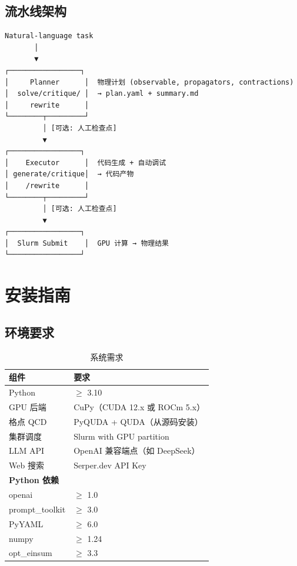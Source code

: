 \documentclass[12pt,a4paper]{ctexart}
\begin{document}
\subsection{流水线架构}

\begin{center}
\begin{tcolorbox}[width=0.9\textwidth,boxrule=0.5pt,colback=gray!5,colframe=gray!50]
\begin{verbatim}
Natural-language task
       │
       ▼
┌─────────────────┐
│     Planner      │  物理计划 (observable, propagators, contractions)
│  solve/critique/ │  → plan.yaml + summary.md
│     rewrite      │
└────────┬─────────┘
         │ [可选: 人工检查点]
         ▼
┌─────────────────┐
│    Executor      │  代码生成 + 自动调试
│ generate/critique│  → 代码产物
│    /rewrite      │
└────────┬─────────┘
         │ [可选: 人工检查点]
         ▼
┌─────────────────┐
│  Slurm Submit    │  GPU 计算 → 物理结果
└─────────────────┘
\end{verbatim}
\end{tcolorbox}
\end{center}

\section{安装指南}

\subsection{环境要求}

\begin{table}[h]
\centering
\begin{tabular}{@{}ll@{}}
\toprule
\textbf{组件} & \textbf{要求} \\
\midrule
Python       & $\ge$ 3.10 \\
GPU 后端     & CuPy（CUDA 12.x 或 ROCm 5.x）\\
格点 QCD     & PyQUDA + QUDA（从源码安装）\\
集群调度     & Slurm with GPU partition \\
LLM API      & OpenAI 兼容端点（如 DeepSeek）\\
Web 搜索     & Serper.dev API Key \\
\midrule
\textbf{Python 依赖} & \\
openai       & $\ge$ 1.0 \\
prompt\_toolkit & $\ge$ 3.0 \\
PyYAML       & $\ge$ 6.0 \\
numpy        & $\ge$ 1.24 \\
opt\_einsum  & $\ge$ 3.3 \\
\bottomrule
\end{tabular}
\caption{系统需求}
\end{table}
\end{document}
